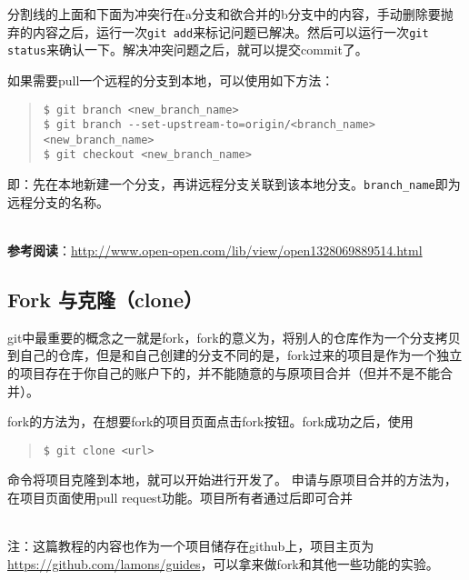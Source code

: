 \documentclass{article}
\begin{document}
			分割线的上面和下面为冲突行在a分支和欲合并的b分支中的内容，手动删除要抛弃的内容之后，运行一次{\tt git add}来标记问题已解决。然后可以运行一次{\tt git status}来确认一下。解决冲突问题之后，就可以提交commit了。
			\par 如果需要pull一个远程的分支到本地，可以使用如下方法：
			\begin{quote}
				\begin{lstlisting}
$ git branch <new_branch_name>
$ git branch --set-upstream-to=origin/<branch_name> <new_branch_name>
$ git checkout <new_branch_name>
				\end{lstlisting}
			\end{quote}
			即：先在本地新建一个分支，再讲远程分支关联到该本地分支。{\tt branch\_name}即为远程分支的名称。
			
			~\\\noindent\textbf{参考阅读}：\url{http://www.open-open.com/lib/view/open1328069889514.html}
		\subsection{Fork 与克隆（clone）} %
		\label{sub:fork_与克隆_clone_}
			git中最重要的概念之一就是fork，fork的意义为，将别人的仓库作为一个分支拷贝到自己的仓库，但是和自己创建的分支不同的是，fork过来的项目是作为一个独立的项目存在于你自己的账户下的，并不能随意的与原项目合并（但并不是不能合并）。
			\par fork的方法为，在想要fork的项目页面点击fork按钮。fork成功之后，使用
			\begin{quote}
				\begin{lstlisting}
$ git clone <url>
				\end{lstlisting}
			\end{quote}
			命令将项目克隆到本地，就可以开始进行开发了。
			申请与原项目合并的方法为，在项目页面使用pull request功能。项目所有者通过后即可合并

			~\\注：这篇教程的内容也作为一个项目储存在github上，项目主页为\url{https://github.com/lamons/guides}，可以拿来做fork和其他一些功能的实验。
\end{document}

